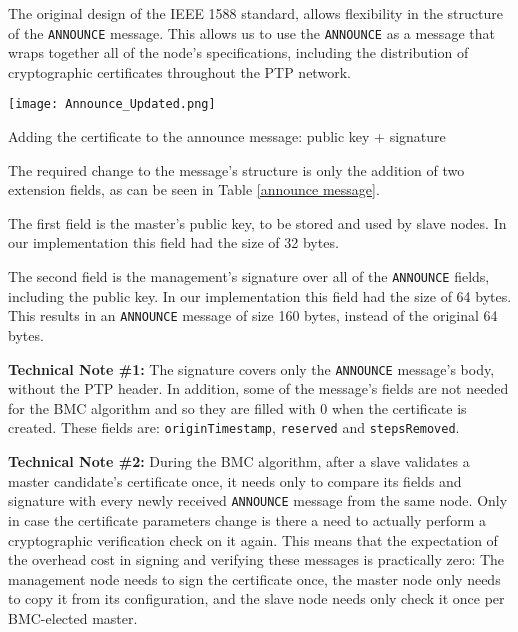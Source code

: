\documentclass[11pt]{article}
\begin{document}
The original design of the IEEE 1588 standard, allows flexibility in the structure of the \texttt{ANNOUNCE} message. This allows us to use the \texttt{ANNOUNCE} as a message that wraps together all of the node's specifications, including the distribution of cryptographic certificates throughout the PTP network.



\begin{table}[t]

\centerline{\texttt{[image: Announce\_Updated.png]}}

\caption{Adding the certificate to the announce message: public key + signature}

\label{announce message}

\end{table}



The required change to the message's structure is only the addition of two extension fields, as can be seen in Table \ref{announce message}.

The first field is the master's public key, to be stored and used by slave nodes. In our implementation this field had the size of 32 bytes.

The second field is the management's signature over all of the \texttt{ANNOUNCE} fields, including the public key. In our implementation this field had the size of 64 bytes. This results in an \texttt{ANNOUNCE} message of size 160 bytes, instead of the original 64 bytes.



\textbf{Technical Note \#1:} The signature covers only the \texttt{ANNOUNCE} message's body, without the PTP header. In addition, some of the message's fields are not needed for the BMC algorithm and so they are filled with 0 when the certificate is created. These fields are: \texttt{originTimestamp}, \texttt{reserved} and \texttt{stepsRemoved}.



\textbf{Technical Note \#2:} During the BMC algorithm, after a slave validates a master candidate's certificate once, it needs only to compare its fields and signature with every newly received \texttt{ANNOUNCE} message from the same node. Only in case the certificate parameters change is there a need to actually perform a cryptographic verification check on it again. This means that the expectation of the overhead cost in signing and verifying these messages is practically zero: The management node needs to sign the certificate once, the master node only needs to copy it from its configuration, and the slave node needs only check it once per BMC-elected master.
\end{document}
